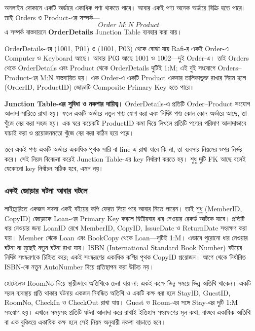 অনলাইন দোকানে একটি অর্ডারে একাধিক পণ্য থাকতে পারে। আবার একই পণ্য অনেক অর্ডারে বিক্রি হতে পারে। তাই Orders ও Product-এর সম্পর্ক--- \[
Order
\;M:N\;
Product
\] এ সম্পর্ক বাস্তবায়নে \textbf{OrderDetails} Junction Table ব্যবহার
করা যায়।



OrderDetails-এর (1001, P01) ও (1001, P03) থেকে বোঝা যায় Rafi-র একই
Order-এ Computer ও Keyboard আছে। আবার P03 আছে 1001 ও 1002—দুই
Order-এ। তাই Orders থেকে OrderDetails এবং Product থেকে OrderDetails
দুটিই 1:M; এই দুই সংযোগে Orders--Product-এর M:N বাস্তবায়িত হয়।
এক Order-এ একটি Product একবার তালিকাভুক্ত রাখার নিয়ম হলে
(OrderID, ProductID) জোড়াটি Composite Primary Key হতে পারে।



\textbf{Junction Table-এর সুবিধা ও নকশার দায়িত্ব।} OrderDetails-এ প্রতিটি Order--Product সংযোগ আলাদা সারিতে রাখা হয়। ফলে একটি অর্ডারে নতুন পণ্য যোগ করা এবং নির্দিষ্ট পণ্য কোন কোন অর্ডারে আছে, তা খুঁজে বের করা সহজ হয়। এক ঘরে কয়েকটি ProductID কমা দিয়ে লিখলে প্রতিটি পণ্যের পরিমাণ আলাদাভাবে যাচাই করা ও প্রয়োজনমতো খুঁজে বের করা কঠিন হয়ে পড়ে।

তবে একই পণ্য একটি অর্ডারে একাধিক পৃথক সারি বা line-এ রাখা যাবে কি না, তা ব্যবসার নিয়মের ওপর নির্ভর করে। সেই নিয়ম বিবেচনা করেই Junction Table-এর key নির্ধারণ করতে হয়। শুধু দুটি FK আছে বলেই যেকোনো key নির্বাচন সঠিক হবে, এমন নয়।

\subsubsection{একই জোড়ার ঘটনা আবার ঘটলে}
লাইব্রেরিতে একজন সদস্য একই বইয়ের কপি ফেরত দিয়ে পরে আবার নিতে পারেন। তাই শুধু (MemberID, CopyID) জোড়াকে Loan-এর Primary Key করলে দ্বিতীয়বার ধার নেওয়ার রেকর্ড আটকে যাবে। প্রতিটি ধার নেওয়ার জন্য LoanID রেখে MemberID, CopyID, IssueDate ও ReturnDate সংরক্ষণ করা যায়। Member থেকে Loan এবং BookCopy থেকে Loan---দুটিই 1:M। এভাবে পুরোনো ধার নেওয়ার ঘটনা না মুছেই নতুন ঘটনা রাখা যায়। ISBN (International Standard Book Number) বইয়ের নির্দিষ্ট সংস্করণকে চিহ্নিত করে; একই সংস্করণের একাধিক কপির পৃথক CopyID প্রয়োজন। আগে থেকে নির্ধারিত ISBN-কে নতুন AutoNumber দিয়ে প্রতিস্থাপন করা উচিত নয়।

হোটেলেও RoomNo দিয়ে স্থায়ীভাবে অতিথিকে চেনা যায় না: একই কক্ষে ভিন্ন সময়ে ভিন্ন অতিথি থাকেন। একটি সরল ব্যবস্থায় প্রতি থাকার ঘটনায় একজন নিবন্ধিত অতিথি ও একটি কক্ষ ধরা হলে StayID, GuestID, RoomNo, CheckIn ও CheckOut রাখা যায়। Guest ও Room-এর সঙ্গে Stay-এর দুটি 1:M সংযোগ হয়। এখানে সময়সহ প্রতিটি ঘটনা আলাদা করে রাখাই ইতিহাস সংরক্ষণের মূল কথা; বাস্তবে একাধিক অতিথি বা এক বুকিংয়ে একাধিক কক্ষ হলে সেই নিয়ম অনুযায়ী নকশা বাড়াতে হবে।

